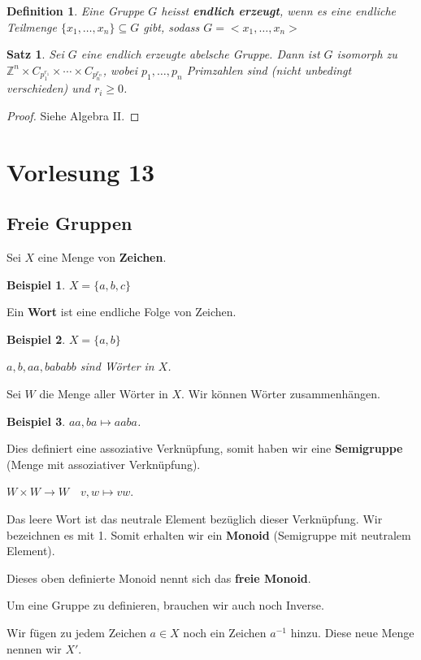 \documentclass{article}
\theoremstyle{plain}
\newtheorem{definition}{Definition}
\newtheorem{theorem}{Satz}
\newtheorem{beispiel}{Beispiel}
\newcommand{\defn}[1]{\textbf{#1}}
\newcommand{\Z}{\mathbb{Z}}
\newcommand{\zykl}[1]{{<}{#1}{>}}
\begin{document}
\begin{definition}
    Eine Gruppe $G$ heisst \defn{endlich erzeugt}, wenn es eine endliche Teilmenge $\{x_1,\ldots,x_n\}\subseteq G$ gibt, sodass $G=\zykl{x_1,\ldots,x_n}$
\end{definition}

\begin{theorem}
    Sei $G$ eine endlich erzeugte abelsche Gruppe. Dann ist $G$ isomorph zu $\Z^n\times C_{p_1^{r_1}}\times\cdots\times C_{p_n^{r_n}}$, wobei $p_1, \ldots, p_n$ Primzahlen sind (nicht unbedingt verschieden) und $r_i\geq 0$.
\end{theorem}
\begin{proof}
    Siehe Algebra II.
\end{proof}

\section*{Vorlesung 13}
\subsection*{Freie Gruppen}
Sei $X$ eine Menge von \defn{Zeichen}.
\begin{beispiel}
    $X=\{a,b,c\}$
\end{beispiel}
Ein \defn{Wort} ist eine endliche Folge von Zeichen.
\begin{beispiel}
    $X=\{a,b\}$

    $a, b, aa, bababb$ sind Wörter in $X$.
\end{beispiel}
Sei $W$ die Menge aller Wörter in $X$. 
Wir können Wörter zusammenhängen.

\begin{beispiel}
    $aa, ba \mapsto aaba$.
\end{beispiel}
Dies definiert eine assoziative Verknüpfung, somit haben wir eine \defn{Semigruppe} (Menge mit assoziativer Verknüpfung).

$W\times W\to W\quad v,w\mapsto vw$.

Das leere Wort ist das neutrale Element bezüglich dieser Verknüpfung. Wir bezeichnen es mit 1.
Somit erhalten wir ein \defn{Monoid} (Semigruppe mit neutralem Element). 

Dieses oben definierte Monoid nennt sich das \defn{freie Monoid}.

Um eine Gruppe zu definieren, brauchen wir auch noch Inverse.

Wir fügen zu jedem Zeichen $a\in X$ noch ein Zeichen $a^{-1}$ hinzu. Diese neue Menge nennen wir $X'$.
\end{document}
